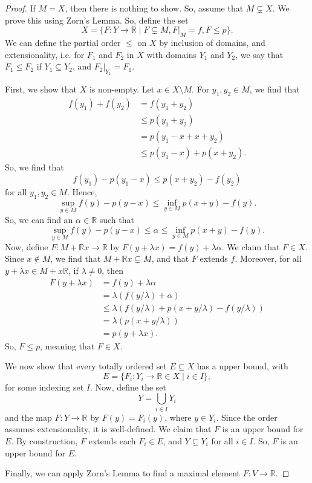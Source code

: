 \documentclass[a4paper, openany]{memoir}
\theoremstyle{definition}
\theoremstyle{plain}
\begin{document}
    \begin{proof}
        If $M = X$, then there is nothing to show. So, assume that $M \subsetneq X$. We prove this using Zorn's Lemma. So, define the set 
        \[X = \{F \colon Y \to \mathbb{R} \mid F \subsetneq M, F|_M = f, F \leq p\}.\]
        We can define the partial order $\leq$ on $X$ by inclusion of domains, and extensionality, i.e. for $F_1$ and $F_2$ in $X$ with domains $Y_1$ and $Y_2$, we say that $F_1 \leq F_2$ if $Y_1 \subseteq Y_2$, and $F_2|_{Y_1} = F_1$.

        First, we show that $X$ is non-empty. Let $x \in X \setminus M$. For $y_1, y_2 \in M$, we find that 
        \begin{align*}
            f(y_1) + f(y_2) &= f(y_1 + y_2) \\
            &\leq p(y_1 + y_2) \\
            &= p(y_1 - x + x + y_2) \\
            &\leq p(y_1 - x) + p(x + y_2).
        \end{align*}
        So, we find that
        \[f(y_1) - p(y_1 - x) \leq p(x + y_2) - f(y_2)\]
        for all $y_1, y_2 \in M$. Hence,
        \[\sup_{y \in M} f(y) - p(y - x) \leq \inf_{y \in M} p(x + y) - f(y).\]
        So, we can find an $\alpha \in \mathbb{R}$ such that
        \[\sup_{y \in M} f(y) - p(y - x) \leq \alpha \leq \inf_{y \in M} p(x + y) - f(y).\]
        Now, define $F \colon M + \mathbb{R}x \to \mathbb{R}$ by $F(y + \lambda x) = f(y) + \lambda \alpha$. We claim that $F \in X$. Since $x \not\in M$, we find that $M + \mathbb{R}x \subsetneq M$, and that $F$ extends $f$. Moreover, for all $y + \lambda x \in M + x \mathbb{R}$, if $\lambda \neq 0$, then 
        \begin{align*}
            F(y + \lambda x) &= f(y) + \lambda \alpha \\
            &= \lambda(f(y/\lambda) + \alpha) \\
            &\leq \lambda(f(y/\lambda) + p(x + y/\lambda) - f(y/\lambda)) \\
            &= \lambda(p(x + y/\lambda)) \\
            &= p(y + \lambda x).
        \end{align*}
        So, $F \leq p$, meaning that $F \in X$.
        
        We now show that every totally ordered set $E \subseteq X$ has a upper bound, with 
        \[E = \{F_i \colon Y_i \to \mathbb{R} \in X \mid i \in I\},\]
        for some indexing set $I$. Now, define the set 
        \[Y = \bigcup_{i \in I} Y_i\]
        and the map $F \colon Y \to \mathbb{R}$ by $F(y) = F_i(y)$, where $y \in Y_i$. Since the order assumes extensionality, it is well-defined. We claim that $F$ is an upper bound for $E$. By construction, $F$ extends each $F_i \in E$, and $Y \subseteq Y_i$ for all $i \in I$. So, $F$ is an upper bound for $E$.

        Finally, we can apply Zorn's Lemma to find a maximal element $F \colon V \to \mathbb{R}$.
    \end{proof}
\end{document}
